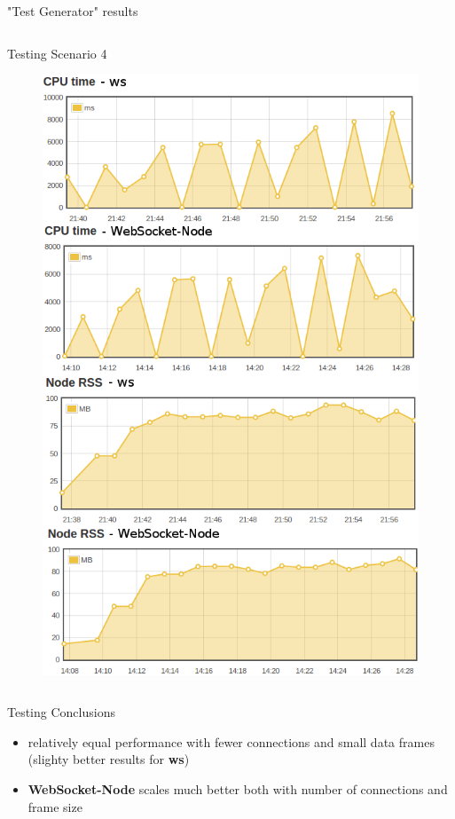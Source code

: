 \documentclass{soa.cs.pub.ro}
\begin{document}
\begin{frame}{"Test Generator" results}
\begin{columns}
\begin{column}[l]{0.45\textwidth}
\begin{center}
        Testing Scenario 4
      \end{center}
      \begin{figure}
         \includegraphics[scale=0.18]{img/test4v2.png}
      \end{figure}
    \end{column}
  \end{columns}
\end{frame}

\begin{frame}{Testing Conclusions}
  \begin{itemize}
    \item relatively equal performance with fewer connections and small data
      frames (slighty better results for \textbf{ws})
    \item \textbf{WebSocket-Node} scales much better both with number of
      connections and frame size
  \end{itemize}
\end{frame}
\end{document}
